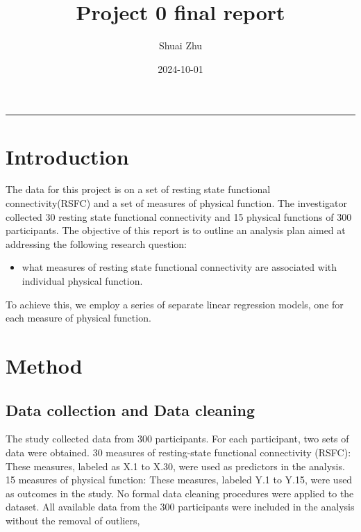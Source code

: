 \documentclass[
  12pt,
]{article}
\title{Project 0 final report}
\author{Shuai Zhu}
\date{2024-10-01}
\providecommand{\tightlist}{%
  \setlength{\itemsep}{0pt}\setlength{\parskip}{0pt}}
\begin{document}
\maketitle

\begin{center}\rule{0.5\linewidth}{0.5pt}\end{center}

\hypertarget{introduction}{%
\section{Introduction}\label{introduction}}

The data for this project is on a set of resting state functional
connectivity(RSFC) and a set of measures of physical function. The
investigator collected 30 resting state functional connectivity and 15
physical functions of 300 participants. The objective of this report is
to outline an analysis plan aimed at addressing the following research
question:

\begin{itemize}
\tightlist
\item
  what measures of resting state functional connectivity are associated
  with individual physical function.
\end{itemize}

To achieve this, we employ a series of separate linear regression
models, one for each measure of physical function.

\hypertarget{method}{%
\section{Method}\label{method}}

\hypertarget{data-collection-and-data-cleaning}{%
\subsection{Data collection and Data
cleaning}\label{data-collection-and-data-cleaning}}

The study collected data from 300 participants. For each participant,
two sets of data were obtained. 30 measures of resting-state functional
connectivity (RSFC): These measures, labeled as X.1 to X.30, were used
as predictors in the analysis. 15 measures of physical function: These
measures, labeled Y.1 to Y.15, were used as outcomes in the study. No
formal data cleaning procedures were applied to the dataset. All
available data from the 300 participants were included in the analysis
without the removal of outliers,
\end{document}
